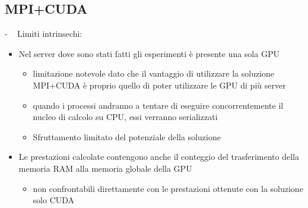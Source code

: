 \documentclass[compress]{beamer}
\begin{document}
\subsection{MPI+CUDA}
\begin{frame}{\secname \text{ }- \subsecname\ }
    Limiti intrinsechi:
    \begin{itemize}
        \item Nel server dove sono stati fatti gli esperimenti è presente una sola GPU
        \begin{itemize}
            \item limitazione notevole dato che il vantaggio di utilizzare la soluzione MPI+CUDA è proprio quello di poter utilizzare le GPU di più server
            \item quando i processi andranno a tentare di eseguire concorrentemente il nucleo di calcolo su CPU, essi verranno serializzati
            \item Sfruttamento limitato del potenziale della soluzione
        \end{itemize}
        \item Le prestazioni calcolate contengono anche il conteggio del trasferimento della memoria RAM alla memoria globale della GPU
        \begin{itemize}
            \item non confrontabili direttamente con le prestazioni ottenute con la soluzione solo CUDA
        \end{itemize}
    \end{itemize}
\end{frame}
\end{document}

